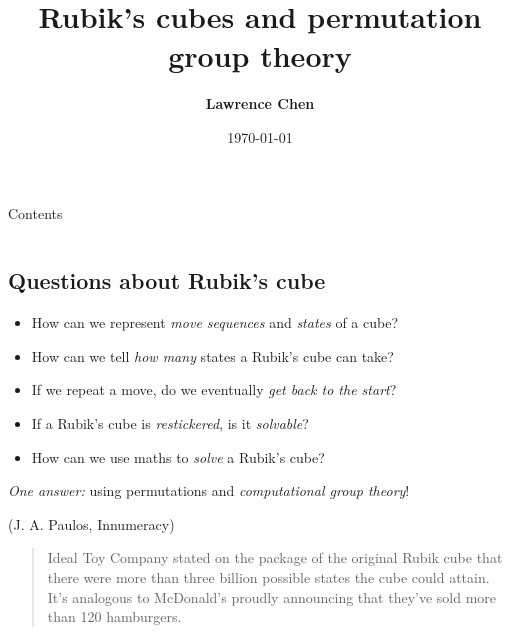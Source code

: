 \documentclass[handout]{beamer}
\title{\textbf{Rubik's cubes and permutation group theory}}
\author{\textbf{Lawrence Chen}}
\institute{\textbf{Honours presentation}}
\date{\today}
\begin{document}
\begin{frame}
    \titlepage
\end{frame}

\begin{frame}{Contents}
    \begin{columns}[t]
        \begin{column}{.5\textwidth}
            \tableofcontents[sections={1-2}]
        \end{column}
        \begin{column}{.5\textwidth}
            \tableofcontents[sections={3-4}]
        \end{column}
    \end{columns}
\end{frame}

\subsection{Questions about Rubik's cube}

\begin{slide}
    \begin{itemize}
        \item How can we represent \textit{move sequences} and \textit{states} of a cube? \pause
        \item How can we tell \textit{how many} states a Rubik's cube can take? \pause
        \item If we repeat a move, do we eventually \textit{get back to the start}? \pause
        \item If a Rubik's cube is \textit{restickered}, is it \textit{solvable}? \pause
        \item How can we use maths to \textit{solve} a Rubik's cube? \pause
    \end{itemize}

    \textit{One answer:} using permutations and \textit{computational group theory}! \pause

    \begin{alertblock}{(J. A. Paulos, Innumeracy)}
        \vspace{4pt}
        \begin{quotation}
            Ideal Toy Company stated on the package of the original Rubik cube that there were more than three billion possible states the cube could attain. It's analogous to McDonald's proudly announcing that they've sold more than 120 hamburgers.
        \end{quotation}
    \end{alertblock}
\end{slide}
\end{document}
